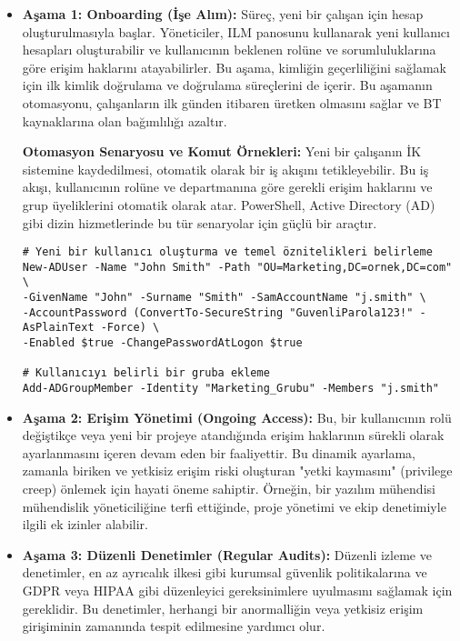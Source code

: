 \begin{itemize}
    \item \textbf{Aşama 1: Onboarding (İşe Alım):} Süreç, yeni bir çalışan için hesap oluşturulmasıyla başlar. Yöneticiler, ILM panosunu kullanarak yeni kullanıcı hesapları oluşturabilir ve kullanıcının beklenen rolüne ve sorumluluklarına göre erişim haklarını atayabilirler. Bu aşama, kimliğin geçerliliğini sağlamak için ilk kimlik doğrulama ve doğrulama süreçlerini de içerir. Bu aşamanın otomasyonu, çalışanların ilk günden itibaren üretken olmasını sağlar ve BT kaynaklarına olan bağımlılığı azaltır.
    
    \textbf{Otomasyon Senaryosu ve Komut Örnekleri:} Yeni bir çalışanın İK sistemine kaydedilmesi, otomatik olarak bir iş akışını tetikleyebilir. Bu iş akışı, kullanıcının rolüne ve departmanına göre gerekli erişim haklarını ve grup üyeliklerini otomatik olarak atar. PowerShell, Active Directory (AD) gibi dizin hizmetlerinde bu tür senaryolar için güçlü bir araçtır.
    
\begin{verbatim}
# Yeni bir kullanıcı oluşturma ve temel öznitelikleri belirleme
New-ADUser -Name "John Smith" -Path "OU=Marketing,DC=ornek,DC=com" \
-GivenName "John" -Surname "Smith" -SamAccountName "j.smith" \
-AccountPassword (ConvertTo-SecureString "GuvenliParola123!" -AsPlainText -Force) \
-Enabled $true -ChangePasswordAtLogon $true

# Kullanıcıyı belirli bir gruba ekleme
Add-ADGroupMember -Identity "Marketing_Grubu" -Members "j.smith"
\end{verbatim}

    \item \textbf{Aşama 2: Erişim Yönetimi (Ongoing Access):} Bu, bir kullanıcının rolü değiştikçe veya yeni bir projeye atandığında erişim haklarının sürekli olarak ayarlanmasını içeren devam eden bir faaliyettir. Bu dinamik ayarlama, zamanla biriken ve yetkisiz erişim riski oluşturan "yetki kaymasını" (privilege creep) önlemek için hayati öneme sahiptir. Örneğin, bir yazılım mühendisi mühendislik yöneticiliğine terfi ettiğinde, proje yönetimi ve ekip denetimiyle ilgili ek izinler alabilir.
    
    \item \textbf{Aşama 3: Düzenli Denetimler (Regular Audits):} Düzenli izleme ve denetimler, en az ayrıcalık ilkesi gibi kurumsal güvenlik politikalarına ve GDPR veya HIPAA gibi düzenleyici gereksinimlere uyulmasını sağlamak için gereklidir. Bu denetimler, herhangi bir anormalliğin veya yetkisiz erişim girişiminin zamanında tespit edilmesine yardımcı olur.
    

\end{itemize}
